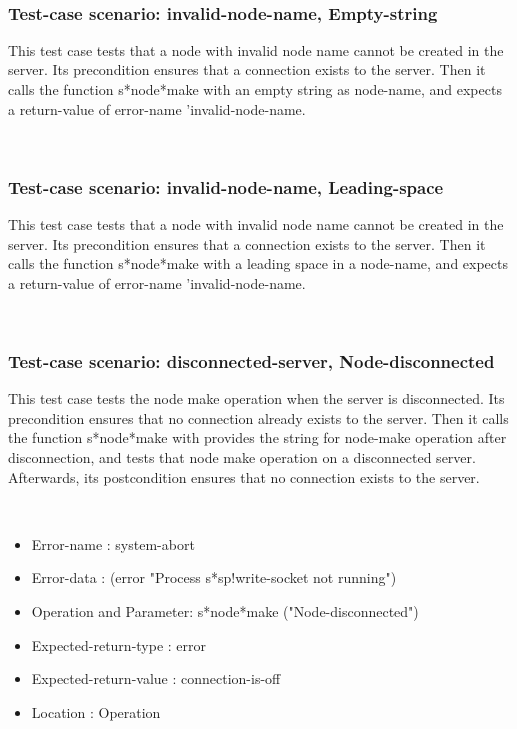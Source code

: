 \
\subsubsection {Test-case scenario: invalid-node-name, Empty-string}


This test case tests that a node with invalid node name cannot be created in the server.
Its precondition ensures that a connection exists to the server.
Then it calls the function s*node*make  with an empty string as node-name, and expects a return-value of error-name 'invalid-node-name.





\
\subsubsection {Test-case scenario: invalid-node-name, Leading-space}


This test case tests that a node with invalid node name cannot be created in the server.
Its precondition ensures that a connection exists to the server.
Then it calls the function s*node*make  with a leading space in a node-name, and expects a return-value of error-name 'invalid-node-name.





\
\subsubsection {Test-case scenario: disconnected-server, Node-disconnected}


This test case tests the node make operation when the server is disconnected.
Its precondition ensures that no connection already exists to the server.
Then it calls the function s*node*make  with provides the string for node-make operation after disconnection, and tests that node make operation on a disconnected server.
Afterwards, its postcondition ensures that no connection exists to the server.


\noindent {\bf Result: FAILED}\
\begin {itemize}
\item 	Error-name             : system-abort
\item Error-data             : (error "Process s*sp!write-socket not running")
\item Operation and Parameter: s*node*make ("Node-disconnected")
\item Expected-return-type   : error
\item Expected-return-value  : connection-is-off
\item Location               : Operation



\end {itemize}
